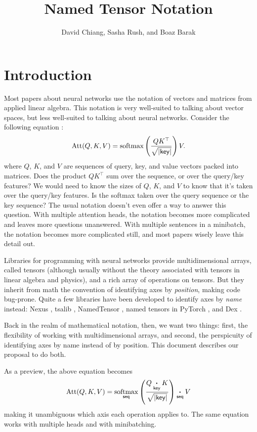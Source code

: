 \documentclass{article}
\title{Named Tensor Notation}
\author{David Chiang, Sasha Rush, and Boaz Barak}
\DeclareMathOperator*{\softmax}{softmax}
\begin{document}
\maketitle

\tableofcontents

\clearpage

\section{Introduction}

Most papers about neural networks use the notation of vectors and matrices from applied linear algebra. This notation is very well-suited to talking about vector spaces, but less well-suited to talking about neural networks. Consider the following equation \citep{vaswani+:2017}:
\[ \text{Att}(Q, K, V) = \softmax \left( \frac{QK^\top}{\sqrt{|\name{key}|}} \right) V. \]
where $Q$, $K$, and $V$ are sequences of query, key, and value vectors packed into matrices. Does the product $QK^\top$ sum over the sequence, or over the query/key features? We would need to know the sizes of $Q$, $K$, and $V$ to know that it's taken over the query/key features. Is the softmax taken over the query sequence or the key sequence? The usual notation doesn't even offer a way to answer this question. With multiple attention heads, the notation becomes more complicated and leaves more questions unanswered. With multiple sentences in a minibatch, the notation becomes more complicated still, and most papers wisely leave this detail out.

Libraries for programming with neural networks \citep{numpy,pytorch} provide multidimensional arrays, called tensors (although usually without the theory associated with tensors in linear algebra and physics), and a rich array of operations on tensors. But they inherit from math the convention of identifying axes by \emph{position}, making code bug-prone. Quite a few libraries have been developed to identify axes by \emph{name} instead: Nexus \citep{chen2017typesafe}, tsalib \citep{tsalib}, NamedTensor \citep{namedtensor}, named tensors in PyTorch \citep{named-tensors}, and Dex \citep{maclaurin+:2019}.

Back in the realm of mathematical notation, then, we want two things: first, the flexibility of working with multidimensional arrays, and second, the perspicuity of identifying axes by name instead of by position. This document describes our proposal to do both.

As a preview, the above equation becomes
\begin{equation*}
  \text{Att}(Q,K,V) = \nfun{seq}{softmax} \left( \frac{Q \ndot{key} K}{\sqrt{|\name{key}|}} \right) \ndot{seq} V
\end{equation*}
making it unambiguous which axis each operation applies to. The same equation works with multiple heads and with minibatching.
\end{document}
